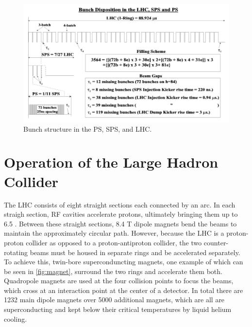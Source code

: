 \begin{centering}
\begin{figure}[!hbt]
\myfloatalign
\includegraphics[width=.90\linewidth]{figures/lhc/bunch_structure.png}
\caption{Bunch structure in the \ac{PS}, \ac{SPS}, and \ac{LHC}.}
\label{fig:bunches}
\end{figure}
\end{centering}

\section{Operation of the Large Hadron Collider}

The \ac{LHC} consists of eight straight sections each connected by an arc. In each straigh section, \ac{RF} cavities accelerate protons, ultimately bringing them up to 6.5 \gev. Between these straight sections, 8.4 T dipole magnets bend the beams to maintain the approximately circular path. However, because the \ac{LHC} is a proton-proton collider as opposed to a proton-antiproton collider, the two counter-rotating beams must be housed in separate rings and be accelerated separately. To achieve this, twin-bore superconduncting magnets, one example of which can be seen in \autoref{fig:magnet}, surround the two rings and accelerate them both. Quadropole magnets are used at the four collision points to focus the beams, which cross at an interaction point at the center of a detector. In total there are 1232  main dipole magnets over 5000 additional magnets, which are all are superconducting and kept below their critical temperatures by liquid helium cooling. 

